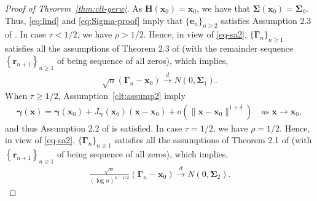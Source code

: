\documentclass[12pt]{amsart}
\theoremstyle{plain}
\theoremstyle{remark}
\numberwithin{equation}{section}
\begin{document}
\begin{proof}[Proof of Theorem~\ref{thm:clt-gerw}]
As $\boldsymbol{H}\left(\boldsymbol{x}_0\right) = \boldsymbol{x}_0$, we have that $\boldsymbol{\Sigma}\left(\boldsymbol{x}_0\right) = \boldsymbol{\Sigma}_0$. Thus, \eqref{eq:lind} and \eqref{eq:Sigma-proof} imply that $\{\boldsymbol{e}_{n}\}_{n\geq2}$ satisfies Assumption 2.3 of \cite{zhang2016central}. In case $\tau < 1/2$, we have $\rho > 1/2$. Hence, in view of \eqref{eq-sa2}, $\{\boldsymbol{\Gamma}_n\}_{n \geq 1}$ satisfies all the assumptions of Theorem 2.3 of \cite{zhang2016central} (with the remainder sequence $\left\{\boldsymbol{r}_{n+1}\right\}_{n \geq 1}$ of \cite{zhang2016central} being sequence of all zeros), which implies, 
\begin{align}\label{eq:diff-conv-proof}
    \sqrt{n}\left(\boldsymbol{\Gamma}_{n} - \boldsymbol{x}_0\right) \stackrel{d}{\to} N\left(0,\boldsymbol{\Sigma}_1\right).
\end{align}
When $\tau \geq 1/2$, Assumption~\ref{clt:assump2} imply  
\begin{align*}
   \boldsymbol{\gamma}(\boldsymbol{x}) = \boldsymbol{\gamma}(\boldsymbol{x}_0) + J_{\boldsymbol{\gamma}}\left(\boldsymbol{x}_0\right)%
   \left(\boldsymbol{x} - \boldsymbol{x}_0\right)  + o\left(\|\boldsymbol{x} - \boldsymbol{x}_0\|^{1+\delta}\right) \quad \text{as } \boldsymbol{x} \to \boldsymbol{x}_0,
\end{align*}
and thus Assumption 2.2 of \cite{zhang2016central} is satisfied.
In case $\tau = 1/2$, we have $\rho = 1/2$. 
Hence, in view of \eqref{eq-sa2}, $\{\boldsymbol{\Gamma}_n\}_{n \geq 1}$ satisfies all the assumptions of Theorem 2.1 of \cite{zhang2016central} (with $\left\{\boldsymbol{r}_{n+1}\right\}_{n \geq 1}$ of \cite{zhang2016central} being sequence of all zeros), which implies, 
\begin{align}\label{eq:cric-conv-proof}
    \frac{\sqrt{n}}{(\log n)^{\kappa - 1/2}}\left(\boldsymbol{\Gamma}_{n} - \boldsymbol{x}_0\right) \stackrel{d}{\to} N\left(0,\boldsymbol{\Sigma}_2\right).
\end{align}


\end{proof}
\end{document}
